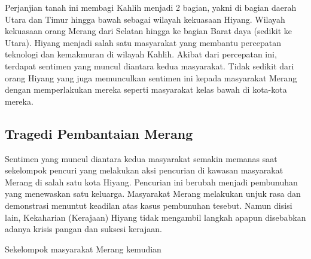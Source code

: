 \documentclass[12pt]{report}
\begin{document}
Perjanjian tanah ini membagi Kahlih menjadi 2 bagian, yakni di bagian daerah Utara dan Timur hingga bawah sebagai wilayah kekuasaan Hiyang. Wilayah kekuasaan orang Merang dari Selatan hingga ke bagian Barat daya (sedikit ke Utara). Hiyang menjadi salah satu masyarakat yang membantu percepatan teknologi dan kemakmuran di wilayah Kahlih. Akibat dari percepatan ini, terdapat sentimen yang muncul diantara kedua masyarakat. Tidak sedikit dari orang Hiyang yang juga memunculkan sentimen ini kepada masyarakat Merang dengan memperlakukan mereka seperti masyarakat kelas bawah di kota-kota mereka.

\subsection{Tragedi Pembantaian Merang}
Sentimen yang muncul diantara kedua masyarakat semakin memanas saat sekelompok pencuri yang melakukan aksi pencurian di kawasan masyarakat Merang di salah satu kota Hiyang. Pencurian ini berubah menjadi pembunuhan yang menewaskan satu keluarga. Masyarakat Merang melakukan unjuk rasa dan demonstrasi menuntut keadilan atas kasus pembunuhan tesebut. Namun disisi lain, Kekaharian (Kerajaan) Hiyang tidak mengambil langkah apapun disebabkan adanya krisis pangan dan suksesi kerajaan.

Sekelompok masyarakat Merang kemudian 
\end{document}
